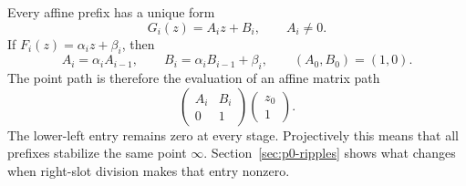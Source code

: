 Every affine prefix has a unique form
\[
  G_i(z)=A_i z+B_i,
  \qquad A_i\ne0.
\]
If $F_i(z)=\alpha_i z+\beta_i$, then
\begin{equation}\label{eq:p0-affine-prefix-recursion}
  A_i=\alpha_i A_{i-1},
  \qquad
  B_i=\alpha_i B_{i-1}+\beta_i,
  \qquad (A_0,B_0)=(1,0).
\end{equation}
The point path is therefore the evaluation of an affine matrix path
\[
  \begin{pmatrix}A_i&B_i\\0&1\end{pmatrix}
  \begin{pmatrix}z_0\\1\end{pmatrix}.
\]
The lower-left entry remains zero at every stage.  Projectively this means that
all prefixes stabilize the same point $\infty$.  Section~\ref{sec:p0-ripples}
shows what changes when right-slot division makes that entry nonzero.
